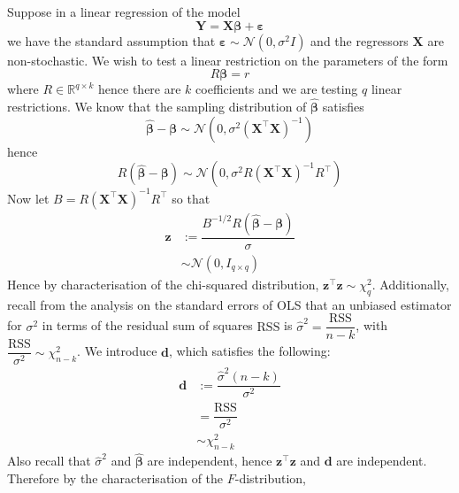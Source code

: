 \documentclass[11pt]{report} %
\begin{document}
Suppose in a linear regression of the model
\begin{equation}
\mathbf{Y} = \mathbf{X}\boldsymbol{\beta} + \boldsymbol{\varepsilon}
\end{equation}
we have the standard assumption that $\boldsymbol{\varepsilon} \sim \mathcal{N}\left(0, \sigma^{2}I\right)$ and the regressors $\mathbf{X}$ are non-stochastic. We wish to test a linear restriction on the parameters of the form
\begin{equation}
R\boldsymbol{\beta} = r
\end{equation}
where $R \in \mathbb{R}^{q\times k}$ hence there are $k$ coefficients and we are testing $q$ linear restrictions. We know that the sampling distribution of $\widehat{\boldsymbol{\beta}}$ satisfies
\begin{equation}
\widehat{\boldsymbol{\beta}} - \boldsymbol{\beta} \sim \mathcal{N}\left(0, \sigma^{2}\left(\mathbf{X}^{\top}\mathbf{X}\right)^{-1}\right)
\end{equation}
hence
\begin{equation}
R\left(\widehat{\boldsymbol{\beta}} - \boldsymbol{\beta}\right) \sim \mathcal{N}\left(0, \sigma^{2}R\left(\mathbf{X}^{\top}\mathbf{X}\right)^{-1}R^{\top}\right)
\end{equation}
Now let $B = R\left(\mathbf{X}^{\top}\mathbf{X}\right)^{-1}R^{\top}$ so that
\begin{align}
\mathbf{z} &:= \dfrac{B^{-1/2}R\left(\widehat{\boldsymbol{\beta}} - \boldsymbol{\beta}\right)}{\sigma} \\
&\sim \mathcal{N}\left(0, I_{q\times q}\right)
\end{align}
Hence by characterisation of the chi-squared distribution, $\mathbf{z}^{\top}\mathbf{z} \sim \chi_{q}^{2}$. Additionally, recall from the analysis on the standard errors of OLS that an unbiased estimator for $\sigma^{2}$ in terms of the residual sum of squares $\mathrm{RSS}$ is $\widehat{\sigma}^{2} = \dfrac{\mathrm{RSS}}{n - k}$, with $\dfrac{\mathrm{RSS}}{\sigma^{2}} \sim \chi_{n - k}^{2}$. We introduce $\mathbf{d}$, which satisfies the following:
\begin{align}
\mathbf{d} &:= \dfrac{\widehat{\sigma}^{2}\left(n - k\right)}{\sigma^{2}} \\
&= \dfrac{\mathrm{RSS}}{\sigma^{2}} \\
&\sim \chi_{n - k}^{2}
\end{align}
Also recall that $\widehat{\sigma}^{2}$ and $\widehat{\boldsymbol{\beta}}$ are independent, hence $\mathbf{z}^{\top}\mathbf{z}$ and $\mathbf{d}$ are independent. Therefore by the characterisation of the $F$-distribution,
\end{document}
